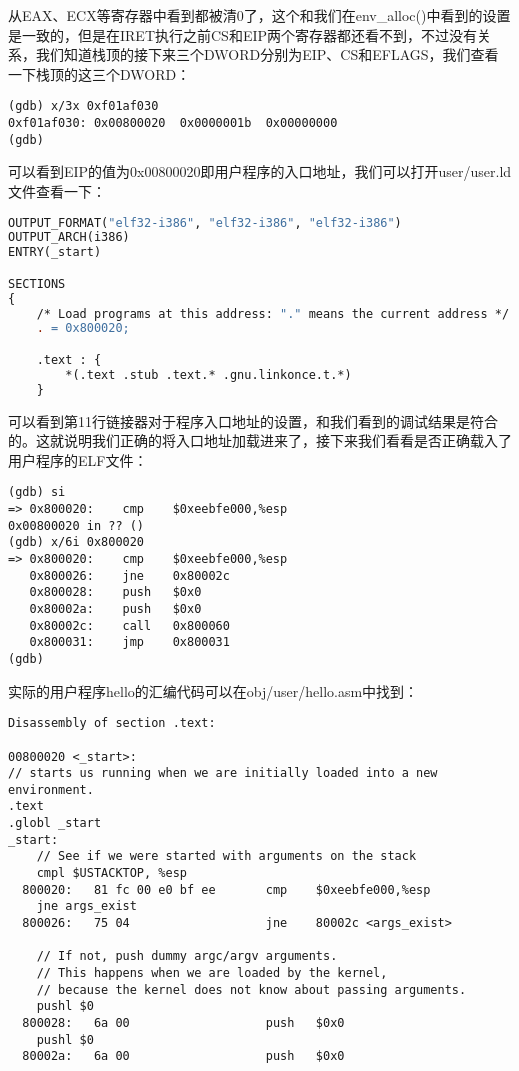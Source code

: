 \documentclass{article}
\newcommand{\funcname}[1]{{\ttfamily \small #1}}
\begin{document}
\begin{CJK*}{UTF8}{gkai}
从EAX、ECX等寄存器中看到都被清0了，这个和我们在\funcname{env\_alloc()}中看到的设置是一致的，但是在IRET执行之前CS和EIP两个寄存器都还看不到，不过没有关系，我们知道栈顶的接下来三个DWORD分别为EIP、CS和EFLAGS，我们查看一下栈顶的这三个DWORD：

\begin{lstlisting}[style=console]
(gdb) x/3x 0xf01af030
0xf01af030:	0x00800020	0x0000001b	0x00000000
(gdb) 
\end{lstlisting}

可以看到EIP的值为0x00800020即用户程序的入口地址，我们可以打开user/user.ld文件查看一下：

\begin{lstlisting}[style=ccode, language=make, firstnumber=4, title={\scriptsize \ttfamily \bfseries user/user.ld}]
OUTPUT_FORMAT("elf32-i386", "elf32-i386", "elf32-i386")
OUTPUT_ARCH(i386)
ENTRY(_start)

SECTIONS
{
	/* Load programs at this address: "." means the current address */
	. = 0x800020;

	.text : {
		*(.text .stub .text.* .gnu.linkonce.t.*)
	}
\end{lstlisting}

可以看到第11行链接器对于程序入口地址的设置，和我们看到的调试结果是符合的。这就说明我们正确的将入口地址加载进来了，接下来我们看看是否正确载入了用户程序的ELF文件：


\begin{lstlisting}[style=console]
(gdb) si
=> 0x800020:	cmp    $0xeebfe000,%esp
0x00800020 in ?? ()
(gdb) x/6i 0x800020
=> 0x800020:	cmp    $0xeebfe000,%esp
   0x800026:	jne    0x80002c
   0x800028:	push   $0x0
   0x80002a:	push   $0x0
   0x80002c:	call   0x800060
   0x800031:	jmp    0x800031
(gdb) 
\end{lstlisting}

实际的用户程序hello的汇编代码可以在obj/user/hello.asm中找到：

\begin{lstlisting}[style=acode, firstnumber=5, title={\scriptsize \ttfamily \bfseries obj/user/hello.asm}]
Disassembly of section .text:

00800020 <_start>:
// starts us running when we are initially loaded into a new environment.
.text
.globl _start
_start:
	// See if we were started with arguments on the stack
	cmpl $USTACKTOP, %esp
  800020:	81 fc 00 e0 bf ee    	cmp    $0xeebfe000,%esp
	jne args_exist
  800026:	75 04                	jne    80002c <args_exist>

	// If not, push dummy argc/argv arguments.
	// This happens when we are loaded by the kernel,
	// because the kernel does not know about passing arguments.
	pushl $0
  800028:	6a 00                	push   $0x0
	pushl $0
  80002a:	6a 00                	push   $0x0


\end{lstlisting}
\end{CJK*}
\end{document}
